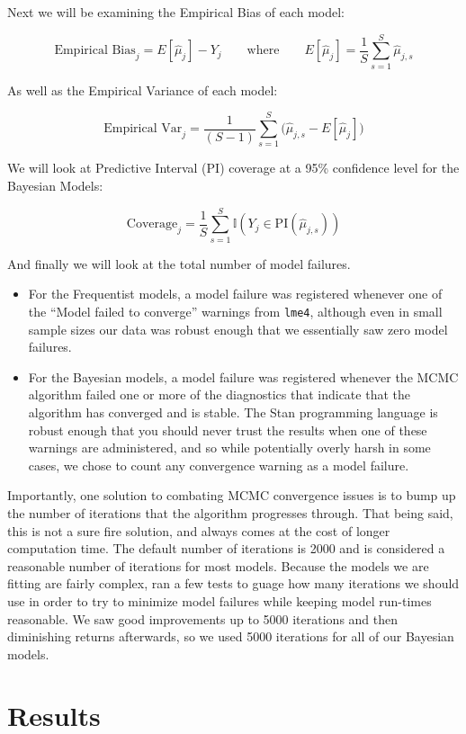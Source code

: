 \documentclass[12pt,twoside]{reedthesis}
\providecommand{\tightlist}{%
  \setlength{\itemsep}{0pt}\setlength{\parskip}{0pt}}
\begin{document}
Next we will be examining the Empirical Bias of each model:

\[
\text{Empirical Bias}_j = E[\hat{\mu}_j] - Y_{j} \qquad \text{where} \qquad E[\hat{\mu}_j] = \frac{1}{S}\sum_{s = 1}^S\hat{\mu}_{j, s}
\]

As well as the Empirical Variance of each model:

\[
\text{Empirical Var}_j  = \frac{1}{(S-1)}\sum_{s = 1}^S\Big(\hat{\mu}_{j,s} - E[\hat{\mu}_j]\Big)
\]

We will look at Predictive Interval (PI) coverage at a 95\% confidence level for the Bayesian Models:

\[
\text{Coverage}_j = \frac{1}{S}\sum_{s = 1}^S \mathbb{I}(Y_{j} \in \text{PI}(\hat{\mu}_{j, s}))
\]

And finally we will look at the total number of model failures.
\begin{itemize}
\tightlist
\item
  For the Frequentist models, a model failure was registered whenever one of the ``Model failed to converge'' warnings from \texttt{lme4}, although even in small sample sizes our data was robust enough that we essentially saw zero model failures.
\item
  For the Bayesian models, a model failure was registered whenever the MCMC algorithm failed one or more of the diagnostics that indicate that the algorithm has converged and is stable. The Stan programming language is robust enough that you should never trust the results when one of these warnings are administered, and so while potentially overly harsh in some cases, we chose to count any convergence warning as a model failure.
\end{itemize}
Importantly, one solution to combating MCMC convergence issues is to bump up the number of iterations that the algorithm progresses through. That being said, this is not a sure fire solution, and always comes at the cost of longer computation time. The default number of iterations is 2000 and is considered a reasonable number of iterations for most models. Because the models we are fitting are fairly complex, ran a few tests to guage how many iterations we should use in order to try to minimize model failures while keeping model run-times reasonable. We saw good improvements up to 5000 iterations and then diminishing returns afterwards, so we used 5000 iterations for all of our Bayesian models.

\hypertarget{res-sec}{%
\chapter{Results}\label{res-sec}}
\end{document}
